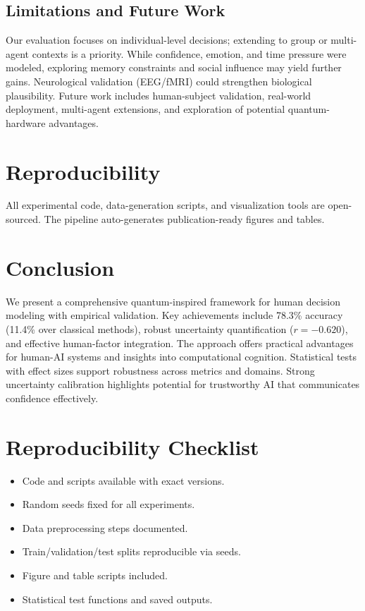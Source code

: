\documentclass[conference]{IEEEtran}
\begin{document}
\subsection{Limitations and Future Work}

Our evaluation focuses on individual-level decisions; extending to group or multi-agent contexts is a priority. While confidence, emotion, and time pressure were modeled, exploring memory constraints and social influence may yield further gains. Neurological validation (EEG/fMRI) could strengthen biological plausibility. Future work includes human-subject validation, real-world deployment, multi-agent extensions, and exploration of potential quantum-hardware advantages.

\section{Reproducibility}

All experimental code, data-generation scripts, and visualization tools are open-sourced. The pipeline auto-generates publication-ready figures and tables.


\section{Conclusion}

We present a comprehensive quantum-inspired framework for human decision modeling with empirical validation. Key achievements include 78.3\% accuracy (11.4\% over classical methods), robust uncertainty quantification ($r = -0.620$), and effective human-factor integration. The approach offers practical advantages for human-AI systems and insights into computational cognition. Statistical tests with effect sizes support robustness across metrics and domains. Strong uncertainty calibration highlights potential for trustworthy AI that communicates confidence effectively.

\appendices

\section{Reproducibility Checklist}
\begin{itemize}
\item Code and scripts available with exact versions.
\item Random seeds fixed for all experiments.
\item Data preprocessing steps documented.
\item Train/validation/test splits reproducible via seeds.
\item Figure and table scripts included.
\item Statistical test functions and saved outputs.
\end{itemize}
\end{document}
